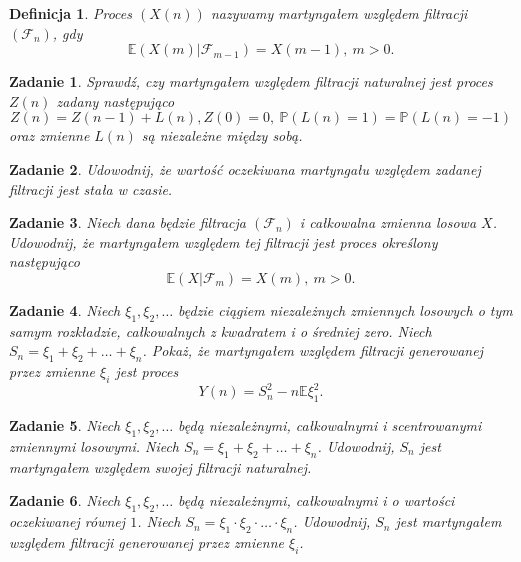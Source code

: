 \documentclass[12pt]{mwart}
\newtheorem{df}{Definicja}
\newtheorem{zd}{Zadanie}
\begin{document}
\begin{df}
	Proces $\left(X(n)\right)$ nazywamy martyngałem względem filtracji $\left(\mathcal{F}_n\right)$, gdy
	\begin{displaymath}
		\mathbb{E}\left(X(m)|\mathcal{F}_{m-1}\right) = X(m-1),\ m > 0.
	\end{displaymath}
\end{df}
\begin{zd}
	Sprawdź, czy martyngałem względem filtracji naturalnej jest proces $Z(n)$ zadany następująco 
	\begin{displaymath}
		Z(n) = Z(n-1) + L(n), Z(0) = 0,\  \mathbb{P}(L(n) = 1)  = \mathbb{P}(L(n) = -1)
	\end{displaymath}
	oraz zmienne $L(n)$ są niezależne między sobą.
\end{zd}
\begin{zd}
	Udowodnij, że wartość oczekiwana martyngału względem zadanej filtracji jest stała w czasie.
\end{zd}
\begin{zd}
	Niech dana będzie filtracja $\left(\mathcal{F}_n\right)$ i całkowalna zmienna losowa $X$. Udowodnij, że martyngałem względem tej filtracji jest proces określony następująco
	\begin{displaymath}
		\mathbb{E}\left(X|\mathcal{F}_{m}\right) = X(m),\ m > 0.
	\end{displaymath}
\end{zd}
\begin{zd}
	Niech $\xi_1, \xi_2, \dots$ będzie ciągiem niezależnych zmiennych losowych o tym samym rozkładzie, całkowalnych z kwadratem i o średniej zero. Niech $S_n = \xi_1 + \xi_2 + \dots + \xi_n$. Pokaż, że martyngałem względem filtracji generowanej przez zmienne $\xi_i$ jest proces \begin{displaymath}
		Y(n) = S_n^2 - n\mathbb{E}\xi_1^2.
	\end{displaymath}
\end{zd}
\begin{zd}
	Niech $\xi_1, \xi_2, \dots$ będą niezależnymi, całkowalnymi i scentrowanymi zmiennymi losowymi. Niech $S_n = \xi_1 + \xi_2 + \dots + \xi_n$. Udowodnij, $S_n$ jest martyngałem względem swojej filtracji naturalnej.
\end{zd}
\begin{zd}
	Niech $\xi_1, \xi_2, \dots$ będą niezależnymi, całkowalnymi i o wartości oczekiwanej równej $1$. Niech $S_n = \xi_1 \cdot \xi_2 \cdot \dots \cdot \xi_n$. Udowodnij, $S_n$ jest martyngałem względem filtracji generowanej przez zmienne $\xi_i$.
\end{zd}
\end{document}
